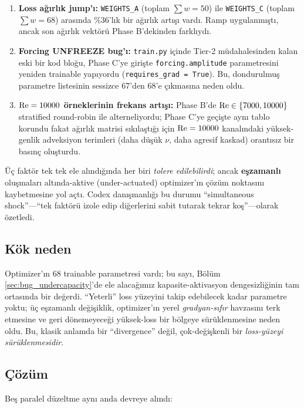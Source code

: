 \begin{enumerate}
    \item \textbf{Loss ağırlık jump'ı:} \texttt{WEIGHTS\_A} (toplam $\sum w = 50$) ile \texttt{WEIGHTS\_C} (toplam $\sum w = 68$) arasında \%36'lık bir ağırlık artışı vardı. Ramp uygulanmıştı, ancak son ağırlık vektörü Phase B'dekinden farklıydı.
    \item \textbf{Forcing UNFREEZE bug'ı:} \texttt{train.py} içinde Tier-2 müdahalesinden kalan eski bir kod bloğu, Phase C'ye girişte \texttt{forcing.amplitude} parametresini yeniden trainable yapıyordu (\texttt{requires\_grad = True}). Bu, dondurulmuş parametre listesinin sessizce 67'den 68'e çıkmasına neden oldu.
    \item \textbf{$\mathrm{Re} = 10000$ örneklerinin frekans artışı:} Phase B'de $\mathrm{Re} \in \{7000, 10000\}$ stratified round-robin ile alterneliyordu; Phase C'ye geçişte aynı tablo korundu fakat ağırlık matrisi sıkılaştığı için $\mathrm{Re} = 10000$ kanalındaki yüksek-genlik adveksiyon terimleri (daha düşük $\nu$, daha agresif kaskad) orantısız bir basınç oluşturdu.
\end{enumerate}

Üç faktör tek tek ele alındığında her biri \textit{tolere edilebilirdi}; ancak \textbf{eşzamanlı} oluşmaları altında-aktive (under-actuated) optimizer'ın çözüm noktasını kaybetmesine yol açtı. Codex danışmanlığı bu durumu ``simultaneous shock''---``tek faktörü izole edip diğerlerini sabit tutarak tekrar koş''---olarak özetledi.

\subsection*{Kök neden}

Optimizer'ın 68 trainable parametresi vardı; bu sayı, Bölüm \ref{sec:bug_undercapacity}'de ele alacağımız kapasite-aktivasyon dengesizliğinin tam ortasında bir değerdi. ``Yeterli'' loss yüzeyini takip edebilecek kadar parametre yoktu; üç eşzamanlı değişiklik, optimizer'ın yerel \textit{gradyan-sıfır} havzasını terk etmesine ve geri dönemeyeceği yüksek-loss bir bölgeye sürüklenmesine neden oldu. Bu, klasik anlamda bir ``divergence'' değil, çok-değişkenli bir \textit{loss-yüzeyi sürüklenmesidir}.

\subsection*{Çözüm}

Beş paralel düzeltme aynı anda devreye alındı:

